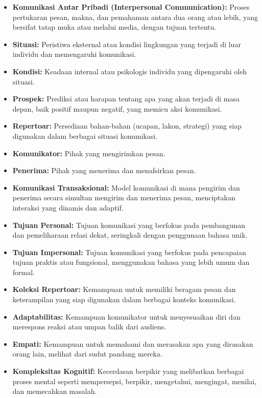 \documentclass[
  letterpaper,
  DIV=11,
  numbers=noendperiod]{scrreprt}
\providecommand{\tightlist}{%
  \setlength{\itemsep}{0pt}\setlength{\parskip}{0pt}}
\begin{document}
\begin{itemize}
\tightlist
\item
  \textbf{Komunikasi Antar Pribadi (Interpersonal Communication):}
  Proses pertukaran pesan, makna, dan pemahaman antara dua orang atau
  lebih, yang bersifat tatap muka atau melalui media, dengan tujuan
  tertentu.
\item
  \textbf{Situasi:} Peristiwa eksternal atau kondisi lingkungan yang
  terjadi di luar individu dan memengaruhi komunikasi.
\item
  \textbf{Kondisi:} Keadaan internal atau psikologis individu yang
  dipengaruhi oleh situasi.
\item
  \textbf{Prospek:} Prediksi atau harapan tentang apa yang akan terjadi
  di masa depan, baik positif maupun negatif, yang memicu aksi
  komunikasi.
\item
  \textbf{Repertoar:} Persediaan bahan-bahan (ucapan, lakon, strategi)
  yang siap digunakan dalam berbagai situasi komunikasi.
\item
  \textbf{Komunikator:} Pihak yang mengirimkan pesan.
\item
  \textbf{Penerima:} Pihak yang menerima dan menafsirkan pesan.
\item
  \textbf{Komunikasi Transaksional:} Model komunikasi di mana pengirim
  dan penerima secara simultan mengirim dan menerima pesan, menciptakan
  interaksi yang dinamis dan adaptif.
\item
  \textbf{Tujuan Personal:} Tujuan komunikasi yang berfokus pada
  pembangunan dan pemeliharaan relasi dekat, seringkali dengan
  penggunaan bahasa unik.
\item
  \textbf{Tujuan Impersonal:} Tujuan komunikasi yang berfokus pada
  pencapaian tujuan praktis atau fungsional, menggunakan bahasa yang
  lebih umum dan formal.
\item
  \textbf{Koleksi Repertoar:} Kemampuan untuk memiliki beragam pesan dan
  keterampilan yang siap digunakan dalam berbagai konteks komunikasi.
\item
  \textbf{Adaptabilitas:} Kemampuan komunikator untuk menyesuaikan diri
  dan merespons reaksi atau umpan balik dari audiens.
\item
  \textbf{Empati:} Kemampuan untuk memahami dan merasakan apa yang
  dirasakan orang lain, melihat dari sudut pandang mereka.
\item
  \textbf{Kompleksitas Kognitif:} Kecerdasan berpikir yang melibatkan
  berbagai proses mental seperti mempersepsi, berpikir, mengetahui,
  mengingat, menilai, dan memecahkan masalah.

\end{itemize}
\end{document}
